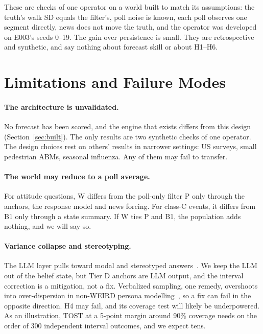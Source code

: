 \documentclass[11pt]{article}
\begin{document}
These are checks of one operator on a world built to match its assumptions: the truth's walk SD equals the filter's, poll noise is known, each poll observes one segment directly, news does not move the truth, and the operator was developed on E003's seeds 0--19. The gain over persistence is small. They are retrospective and synthetic, and say nothing about forecast skill or about H1--H6.

\section{Limitations and Failure Modes}\label{sec:limits}

\paragraph{The architecture is unvalidated.} No forecast has been scored, and the engine that exists differs from this design (Section~\ref{sec:built}). The only results are two synthetic checks of one operator. The design choices rest on others' results in narrower settings: US surveys, small pedestrian ABMs, seasonal influenza. Any of them may fail to transfer.

\paragraph{The world may reduce to a poll average.} For attitude questions, W differs from the poll-only filter P only through the anchors, the response model and news forcing. For class-C events, it differs from B1 only through a state summary. If W ties P and B1, the population adds nothing, and we will say so.

\paragraph{Variance collapse and stereotyping.} The LLM layer pulls toward modal and stereotyped answers~\citep{bisbee2024synthetic,peng2025funhouse,wang2024misportray,xiao2026chameleon}. We keep the LLM out of the belief state, but Tier D anchors are LLM output, and the interval correction is a mitigation, not a fix. Verbalized sampling, one remedy, overshoots into over-dispersion in non-WEIRD persona modelling~\citep{ozkan2026distribution}, so a fix can fail in the opposite direction. H4 may fail, and its coverage test will likely be underpowered. As an illustration, TOST at a 5-point margin around 90\% coverage needs on the order of 300 independent interval outcomes, and we expect tens.
\end{document}
